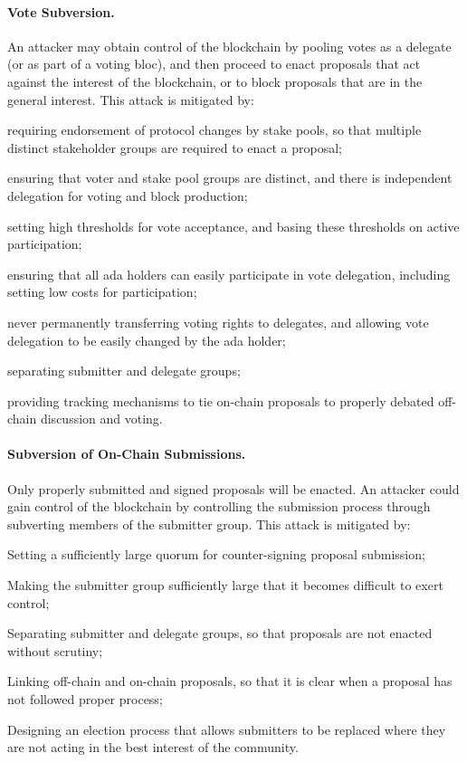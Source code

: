 \paragraph{Vote Subversion.}
An attacker may obtain control of the blockchain by pooling votes as a delegate (or as part of a voting bloc), and then proceed to enact proposals that act against the interest of the blockchain, or to block
proposals that are in the general interest.   This attack is mitigated by:
  \begin{inparaenum}
  \item
    requiring endorsement of protocol changes by stake pools, so that multiple distinct stakeholder groups are required to enact a proposal;
  \item
    ensuring that voter and stake pool groups are distinct, and there is independent delegation for voting and block production;
  \item
    setting high thresholds for vote acceptance, and basing these thresholds on active participation;
  \item
    ensuring that all ada holders can easily participate in vote delegation, including setting low costs for participation;
  \item
    never permanently transferring voting rights to delegates, and allowing vote delegation to be easily changed by the ada holder;
  \item
    separating submitter and delegate groups;
  \item
    providing tracking mechanisms to tie on-chain proposals to properly debated off-chain discussion and voting.
  \end{inparaenum}

\paragraph{Subversion of On-Chain Submissions.}
Only properly submitted and signed proposals will be enacted.  An attacker could gain control of the blockchain by controlling the submission process through
subverting members of the submitter group.
%
This attack is mitigated by:
  \begin{inparaenum}
  \item
    Setting a sufficiently large quorum for counter-signing proposal submission;
  \item
    Making the submitter group sufficiently large that it becomes difficult to exert control;
  \item
    Separating submitter and delegate groups, so that proposals are not enacted without scrutiny;
  \item
    Linking off-chain and on-chain proposals, so that it is clear when a proposal has not followed proper process;
  \item
    Designing an election process that allows submitters to be replaced where they are not acting in the best interest of the community.
  \end{inparaenum}


